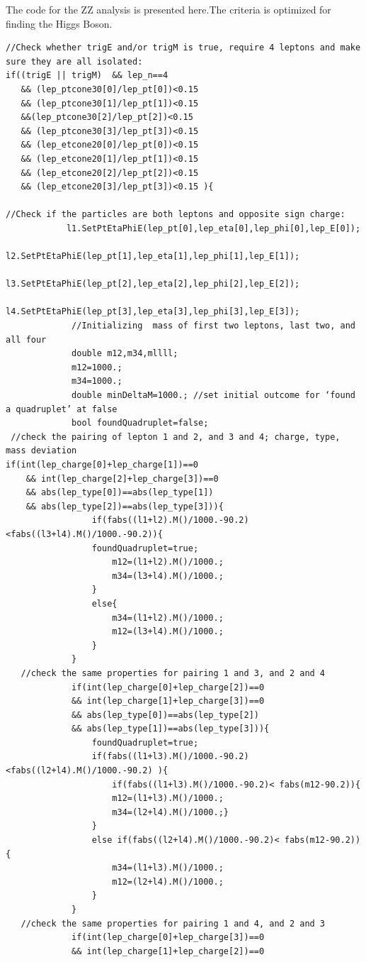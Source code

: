 \documentclass[runningheads,a4paper]{llncs}
\begin{document}
\fontsize{7}{5}\selectfont
The code for the ZZ analysis is presented here.The criteria is optimized for finding the Higgs Boson.
\begin{verbatim}
//Check whether trigE and/or trigM is true, require 4 leptons and make sure they are all isolated:
if((trigE || trigM)  && lep_n==4 
   && (lep_ptcone30[0]/lep_pt[0])<0.15
   && (lep_ptcone30[1]/lep_pt[1])<0.15 
   &&(lep_ptcone30[2]/lep_pt[2])<0.15 
   && (lep_ptcone30[3]/lep_pt[3])<0.15 
   && (lep_etcone20[0]/lep_pt[0])<0.15 
   && (lep_etcone20[1]/lep_pt[1])<0.15 
   && (lep_etcone20[2]/lep_pt[2])<0.15 
   && (lep_etcone20[3]/lep_pt[3])<0.15 ){ 
   
//Check if the particles are both leptons and opposite sign charge:
   	   		l1.SetPtEtaPhiE(lep_pt[0],lep_eta[0],lep_phi[0],lep_E[0]);    
   			 l2.SetPtEtaPhiE(lep_pt[1],lep_eta[1],lep_phi[1],lep_E[1]);
   			 l3.SetPtEtaPhiE(lep_pt[2],lep_eta[2],lep_phi[2],lep_E[2]);    
   			 l4.SetPtEtaPhiE(lep_pt[3],lep_eta[3],lep_phi[3],lep_E[3]); 
             //Initializing  mass of first two leptons, last two, and all four
   			 double m12,m34,mllll;
   			 m12=1000.;
   			 m34=1000.;
   			 double minDeltaM=1000.; //set initial outcome for ‘found a quadruplet’ at false
   			 bool foundQuadruplet=false; 
 //check the pairing of lepton 1 and 2, and 3 and 4; charge, type, mass deviation
if(int(lep_charge[0]+lep_charge[1])==0 
    && int(lep_charge[2]+lep_charge[3])==0 
    && abs(lep_type[0])==abs(lep_type[1]) 
    && abs(lep_type[2])==abs(lep_type[3])){
   				 if(fabs((l1+l2).M()/1000.-90.2)<fabs((l3+l4).M()/1000.-90.2)){
   				 foundQuadruplet=true;
   					 m12=(l1+l2).M()/1000.;
   					 m34=(l3+l4).M()/1000.;
   				 }
   				 else{
   					 m34=(l1+l2).M()/1000.;
   					 m12=(l3+l4).M()/1000.; 
   				 }
   			 }
   //check the same properties for pairing 1 and 3, and 2 and 4
   			 if(int(lep_charge[0]+lep_charge[2])==0 
             && int(lep_charge[1]+lep_charge[3])==0 
             && abs(lep_type[0])==abs(lep_type[2]) 
             && abs(lep_type[1])==abs(lep_type[3])){
   				 foundQuadruplet=true;
   				 if(fabs((l1+l3).M()/1000.-90.2)<fabs((l2+l4).M()/1000.-90.2) ){
   					 if(fabs((l1+l3).M()/1000.-90.2)< fabs(m12-90.2)){
   					 m12=(l1+l3).M()/1000.;
   					 m34=(l2+l4).M()/1000.;}
   				 }
   				 else if(fabs((l2+l4).M()/1000.-90.2)< fabs(m12-90.2)){
   					 m34=(l1+l3).M()/1000.;
   					 m12=(l2+l4).M()/1000.;
   				 }
   			 }
   //check the same properties for pairing 1 and 4, and 2 and 3
   			 if(int(lep_charge[0]+lep_charge[3])==0 
             && int(lep_charge[1]+lep_charge[2])==0 

\end{verbatim}
\end{document}
